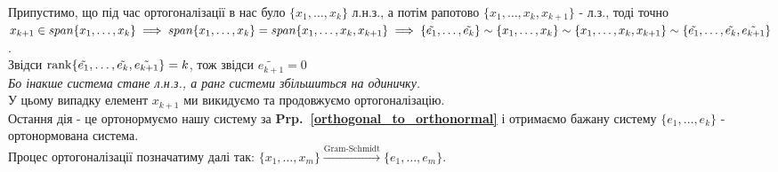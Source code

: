 \documentclass[a4paper, 10pt]{article}
\theoremstyle{theoremdd}
\newcommand\prpref[1]{\textbf{Prp.~\ref{#1}}}
\begin{document}
\bigskip \\
Припустимо, що під час ортогоналізації в нас було $\{x_1,\dots,x_k\}$ л.н.з., а потім рапотово $\{x_1,\dots,x_k, x_{k+1}\}$ - л.з., тоді точно $x_{k+1} \in span \{x_1,\dots,x_k\} \implies span \{x_1,\dots,x_k\} = span \{x_1,\dots,x_k,x_{k+1}\} \\ \implies \{\tilde{e_1},\dots,\tilde{e_k}\} \sim \{x_1,\dots,x_k\} \sim \{x_1,\dots,x_k,x_{k+1}\} \sim \{\tilde{e_1},\dots,\tilde{e_k},\tilde{e_{k+1}}\}$.\\
Звідси $\rank \{\tilde{e_1},\dots,\tilde{e_k},\tilde{e_{k+1}}\} = k$, тож звідси $\tilde{e_{k+1}} = 0$\\
\textit{Бо інакше система стане л.н.з., а ранг системи збільшиться на одиничку.}\\
У цьому випадку елемент $x_{k+1}$ ми викидуємо та продовжуємо ортогоналізацію.
\bigskip \\
Остання дія - це ортонормуємо нашу систему за \prpref{orthogonal_to_orthonormal} і отримаємо бажану систему $\{e_1,\dots,e_k\}$ - ортонормована система.
\bigskip \\
Процес ортогоналізації позначатиму далі так: $\{x_1,\dots,x_m\} \overset{\text{Gram-Schmidt}}{\longrightarrow} \{e_1,\dots,e_m\}$.
\end{document}
